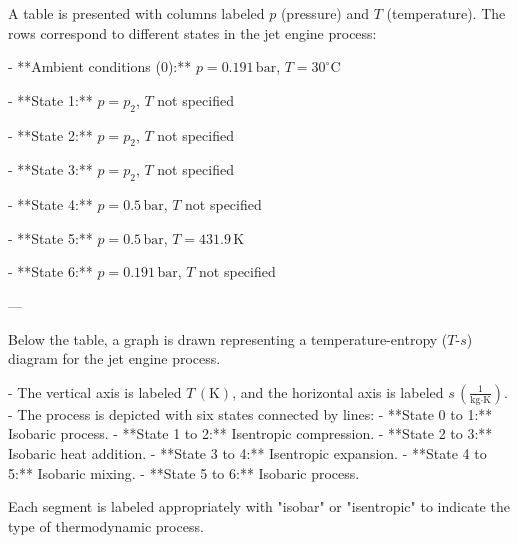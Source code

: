A table is presented with columns labeled \( p \) (pressure) and \( T \) (temperature). The rows correspond to different states in the jet engine process:  

- **Ambient conditions (0):**  
  \( p = 0.191 \, \text{bar} \), \( T = 30^\circ\text{C} \)  

- **State 1:**  
  \( p = p_2 \), \( T \) not specified  

- **State 2:**  
  \( p = p_2 \), \( T \) not specified  

- **State 3:**  
  \( p = p_2 \), \( T \) not specified  

- **State 4:**  
  \( p = 0.5 \, \text{bar} \), \( T \) not specified  

- **State 5:**  
  \( p = 0.5 \, \text{bar} \), \( T = 431.9 \, \text{K} \)  

- **State 6:**  
  \( p = 0.191 \, \text{bar} \), \( T \) not specified  

---

Below the table, a graph is drawn representing a temperature-entropy (\( T \)-\( s \)) diagram for the jet engine process.  

- The vertical axis is labeled \( T \, (\text{K}) \), and the horizontal axis is labeled \( s \, \left( \frac{1}{\text{kg·K}} \right) \).  
- The process is depicted with six states connected by lines:  
  - **State 0 to 1:** Isobaric process.  
  - **State 1 to 2:** Isentropic compression.  
  - **State 2 to 3:** Isobaric heat addition.  
  - **State 3 to 4:** Isentropic expansion.  
  - **State 4 to 5:** Isobaric mixing.  
  - **State 5 to 6:** Isobaric process.  

Each segment is labeled appropriately with "isobar" or "isentropic" to indicate the type of thermodynamic process.